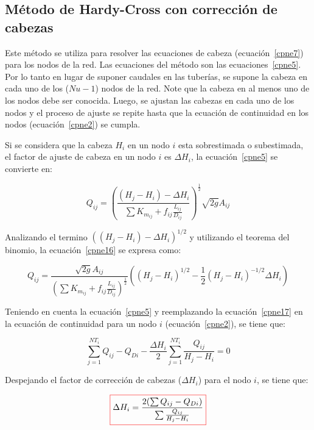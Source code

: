 \documentclass[11pt, oneside]{article}
\begin{document}
\subsection{M\'etodo de Hardy-Cross con correcci\'on de cabezas}
Este m\'etodo se utiliza para resolver las ecuaciones de cabeza (ecuaci\'on~\ref{cpne7}) para los nodos de la red. Las ecuaciones del m\'etodo son las ecuaciones~\ref{cpne5}. Por lo tanto en lugar de suponer caudales en las tuber\'ias, se supone la cabeza en cada uno de los ($Nu-1$) nodos de la red. Note que la cabeza en al menos uno de los nodos debe ser conocida. Luego, se ajustan las cabezas en cada uno de los nodos y el proceso de ajuste se repite hasta que la ecuaci\'on de continuidad en los nodos (ecuaci\'on~\ref{cpne2}) se cumpla. 

Si se considera que la cabeza $H_i$ en un nodo $i$ esta sobrestimada o subestimada, el factor de ajuste de cabeza en un nodo $i$ es $\Delta H_i$, la ecuaci\'on~\ref{cpne5} se convierte en:

\begin{equation}
Q_{ij} = \left(\frac{ (H_j - H_i)- \Delta H_i }{\sum K_{m_{ij}}  + f_{ij}\frac{L_{ij}}{D_{ij}} } \right)^{\frac{1}{2}} \sqrt{2g} A_{ij}
\label{cpne16}
\end{equation}

Analizando el termino $\left( (H_j - H_i)- \Delta H_i \right)^{1/2} $ y utilizando el teorema del binomio, la ecuaci\'on~\ref{cpne16} se expresa como:

\begin{equation}
Q_{ij} = \frac{\sqrt{2g} A_{ij} }{\left( \sum K_{m_{ij}}  + f_{ij}\frac{L_{ij}}{D_{ij}} \right)^{\frac{1}{2}}} \left((H_j - H_i)^{1/2} -\frac{1}{2} (H_j - H_i)^{-1/2}\Delta H_i \right)  
\label{cpne17}
\end{equation}

Teniendo en cuenta la ecuaci\'on~\ref{cpne5} y reemplazando la ecuaci\'on~\ref{cpne17} en la ecuaci\'on de continuidad para un nodo $i$ (ecuaci\'on~\ref{cpne2}), se tiene que:

\begin{equation}
\sum_{j=1}^{NT_i} Q_{ij} - Q_{Di} -\frac{\Delta H_i}{2} \sum_{j=1}^{NT_i} \frac{Q_{ij}}{H_j - H_i}= 0
\label{cpne18}
\end{equation}

Despejando el factor de correcci\'on de cabezas ($\Delta H_i$) para el nodo $i$, se tiene que:

\begin{equation}
\color{red}\boxed{\color{black} \Delta H_i = \frac{2(\sum Q_{ij}-Q_{Di})}{\sum \frac{Q_{ij}}{H_j - H_i }} }
\label{cpne19}
\end{equation}
\end{document}
